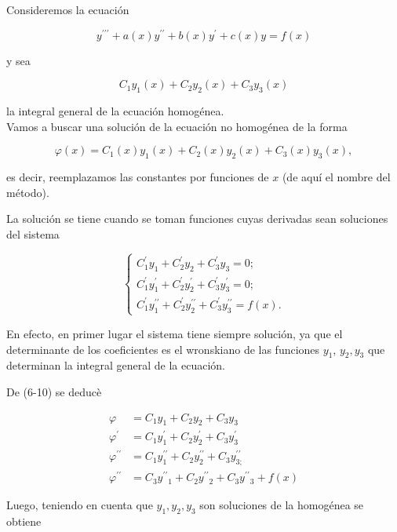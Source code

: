 \documentclass[10pt]{article}
\theoremstyle{plain}
\theoremstyle{definition}
\theoremstyle{remark}
\begin{document}
Consideremos la ecuación


\begin{equation*}
y^{\prime \prime \prime}+a(x) y^{\prime \prime}+b(x) y^{\prime}+c(x) y=f(x) \tag{6-9}
\end{equation*}


y sea

$$
C_{1} y_{1}(x)+C_{2} y_{2}(x)+C_{3} y_{3}(x)
$$

la integral general de la ecuación homogénea.\\
Vamos a buscar una solución de la ecuación no homogénea de la forma

$$
\varphi(x)=C_{1}(x) y_{1}(x)+C_{2}(x) y_{2}(x)+C_{3}(x) y_{3}(x),
$$

es decir, reemplazamos las constantes por funciones de $x$ (de aquí el nombre del método).

La solución se tiene cuando se toman funciones cuyas derivadas sean soluciones del sistema

\[
\left\{\begin{array}{l}
C_{1}^{\prime} y_{1}+C_{2}^{\prime} y_{2}+C_{3}^{\prime} y_{3}=0 ;  \tag{6-10}\\
C_{1}^{\prime} y_{1}^{\prime}+C_{2}^{\prime} y_{2}^{\prime}+C_{3}^{\prime} y_{3}^{\prime}=0 ; \\
C_{1}^{\prime} y_{1}^{\prime \prime}+C_{2}^{\prime} y_{2}^{\prime \prime}+C_{3}^{\prime} y_{3}^{\prime \prime}=f(x) .
\end{array}\right.
\]

En efecto, en primer lugar el sistema tiene siempre solución, ya que el determinante de los coeficientes es el wronskiano de las funciones $y_{1}$, $y_{2}, y_{3}$ que determinan la integral general de la ecuación.

De (6-10) se deducè

$$
\begin{aligned}
\varphi & =C_{1} y_{1}+C_{2} y_{2}+C_{3} y_{3} \\
\varphi^{\prime} & =C_{1} y_{1}^{\prime}+C_{2} y_{2}^{\prime}+C_{3} y_{3}^{\prime} \\
\varphi^{\prime \prime} & =C_{1} y_{1}^{\prime \prime}+C_{2} y_{2}^{\prime \prime}+C_{3} y_{3 ;}^{\prime \prime} \\
\varphi^{\prime \prime} & =C_{3} y^{\prime \prime}{ }_{1}+C_{2} y^{\prime \prime}{ }_{2}+C_{3} y^{\prime \prime}{ }_{3}+f(x)
\end{aligned}
$$

Luego, teniendo en cuenta que $y_{1}, y_{2}, y_{3}$ son soluciones de la homogénea se obtiene
\end{document}
